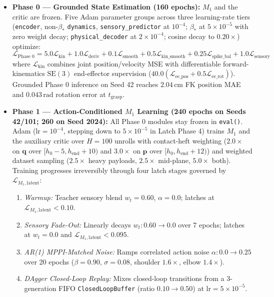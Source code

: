 \documentclass[11pt]{article}
\begin{document}
\begin{itemize}
    \item \textbf{Phase 0 --- Grounded State Estimation (160 epochs):} $M_1$ and the critic are frozen. Five Adam parameter groups across three learning-rate tiers (\texttt{encoder}, non-$\beta_*$ \texttt{dynamics}, \texttt{sensory\_predictor} at $10^{-4}$; $\beta_*$ at $5\times 10^{-5}$ with zero weight decay; \texttt{physical\_decoder} at $2\times 10^{-4}$; cosine decay to $0.20\times$) optimize:
    \[
    \mathcal{L}_{\text{Phase 0}} = 5.0\mathcal{L}_{\text{kin}} + 1.0\mathcal{L}_{\text{deriv}} + 0.1\mathcal{L}_{\text{smooth}} + 0.5\mathcal{L}_{\text{kin\_smooth}} + 0.25\mathcal{L}_{\text{spike\_bal}} + 1.0\mathcal{L}_{\text{sensory}}
    \]
    where $\mathcal{L}_{\text{kin}}$ combines joint position/velocity MSE with differentiable forward-kinematics $\text{SE}(3)$ end-effector supervision ($40.0(\mathcal{L}_{\text{ee\_pos}} + 0.5\mathcal{L}_{\text{ee\_rot}})$). Grounded Phase 0 inference on Seed 42 reaches $2.04\,\text{cm}$ FK position MAE and $0.043\,\text{rad}$ rotation error at $t_{\text{grasp}}$.

    \item \textbf{Phase 1 --- Action-Conditioned $M_1$ Learning (240 epochs on Seeds 42/101; 260 on Seed 2024):} All Phase 0 modules stay frozen in \texttt{eval()}. Adam ($\text{lr} = 10^{-4}$, stepping down to $5\times 10^{-5}$ in Latch Phase 4) trains $M_1$ and the auxiliary critic over $H=100$ unrolls with contact-heft weighting ($2.0\times$ on $\mathbf{q}$ over $[h_0-5, h_{\text{end}}+10)$ and $3.0\times$ on $\mathbf{p}$ over $[h_0, h_{\text{end}}+12)$) and weighted dataset sampling ($2.5\times$ heavy payloads, $2.5\times$ mid-plane, $5.0\times$ both). Training progresses irreversibly through four latch stages governed by $\mathcal{L}_{M_1,\text{latent}}$:
    \begin{enumerate}
        \item \emph{Warmup:} Teacher sensory blend $w_t = 0.60$, $\alpha = 0.0$; latches at $\mathcal{L}_{M_1,\text{latent}} < 0.10$.
        \item \emph{Sensory Fade-Out:} Linearly decays $w_t: 0.60 \to 0.0$ over 7 epochs; latches at $w_t = 0.0$ and $\mathcal{L}_{M_1,\text{latent}} < 0.095$.
        \item \emph{AR(1) MPPI-Matched Noise:} Ramps correlated action noise $\alpha: 0.0 \to 0.25$ over 20 epochs ($\beta = 0.90$, $\sigma = 0.08$, shoulder $1.6\times$, elbow $1.4\times$).
        \item \emph{DAgger Closed-Loop Replay:} Mixes closed-loop transitions from a 3-generation FIFO \texttt{ClosedLoopBuffer} (ratio $0.10 \to 0.50$) at $\text{lr} = 5\times 10^{-5}$.
    \end{enumerate}
\end{itemize}
\end{document}
